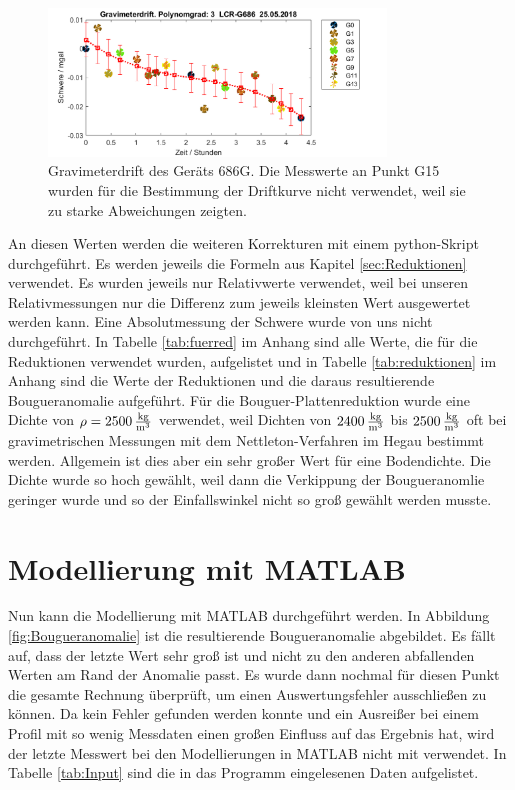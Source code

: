 \begin{figure}[!ht]
 \centering
 \includegraphics[width=0.8\textwidth]{fig/G686drift_endgultig}
 \caption[Gravimeterdrift des Geräts 686G]{Gravimeterdrift des Geräts 686G. Die Messwerte an Punkt G15 wurden für die Bestimmung der Driftkurve nicht verwendet, weil sie zu starke Abweichungen zeigten.}
 \label{fig:drift2}
\end{figure}

An diesen Werten werden die weiteren Korrekturen mit einem python-Skript durchgeführt. Es werden jeweils die Formeln aus Kapitel \ref{sec:Reduktionen} verwendet. Es wurden jeweils nur Relativwerte verwendet, weil bei unseren Relativmessungen nur die Differenz zum jeweils kleinsten Wert ausgewertet werden kann. Eine Absolutmessung der Schwere wurde von uns nicht durchgeführt. In Tabelle \ref{tab:fuerred} im Anhang sind alle Werte, die für die Reduktionen verwendet wurden, aufgelistet und in Tabelle \ref{tab:reduktionen} im Anhang sind die Werte der Reduktionen und die daraus resultierende Bougueranomalie aufgeführt. Für die Bouguer-Plattenreduktion wurde eine Dichte von $\rho=2500\,\frac{\mathrm{kg}}{\mathrm{m^3}}$ verwendet, weil Dichten von $2400\,\frac{\mathrm{kg}}{\mathrm{m^3}}$ bis $2500\,\frac{\mathrm{kg}}{\mathrm{m^3}}$ oft bei gravimetrischen Messungen mit dem Nettleton-Verfahren im Hegau bestimmt werden. Allgemein ist dies aber ein sehr großer Wert für eine Bodendichte. Die Dichte wurde so hoch gewählt, weil dann die Verkippung der Bougueranomlie geringer wurde und so der Einfallswinkel nicht so groß gewählt werden musste.

\section{Modellierung mit MATLAB}

Nun kann die Modellierung mit MATLAB durchgeführt werden. In Abbildung \ref{fig:Bougueranomalie} ist die resultierende Bougueranomalie abgebildet. Es fällt auf, dass der letzte Wert sehr groß ist und nicht zu den anderen abfallenden Werten am Rand der Anomalie passt. Es wurde dann nochmal für diesen Punkt die gesamte Rechnung überprüft, um einen Auswertungsfehler ausschließen zu können. Da kein Fehler gefunden werden konnte und ein Ausreißer bei einem Profil mit so wenig Messdaten einen großen Einfluss auf das Ergebnis hat, wird der letzte Messwert bei den Modellierungen in MATLAB nicht mit verwendet. In Tabelle \ref{tab:Input} sind die in das Programm eingelesenen Daten aufgelistet.

